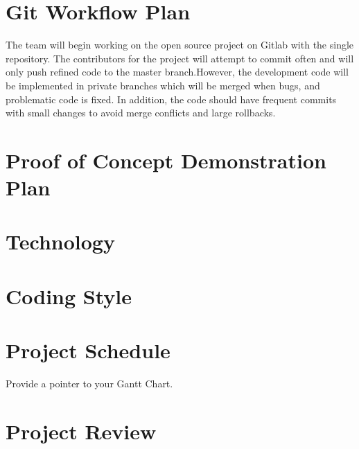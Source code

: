 \documentclass{article}
\begin{document}
\section{Git Workflow Plan}
The team will begin working on the open source project on Gitlab with the single repository. The contributors for the project will attempt to commit often and will only push refined code to the master branch.However, the development code will be implemented in private branches which will be merged when bugs, and problematic code is fixed. In addition, the code should have frequent commits with small changes to avoid merge conflicts and large rollbacks.
\section{Proof of Concept Demonstration Plan}

\section{Technology}

\section{Coding Style}

\section{Project Schedule}

Provide a pointer to your Gantt Chart.

\section{Project Review}
\end{document}
